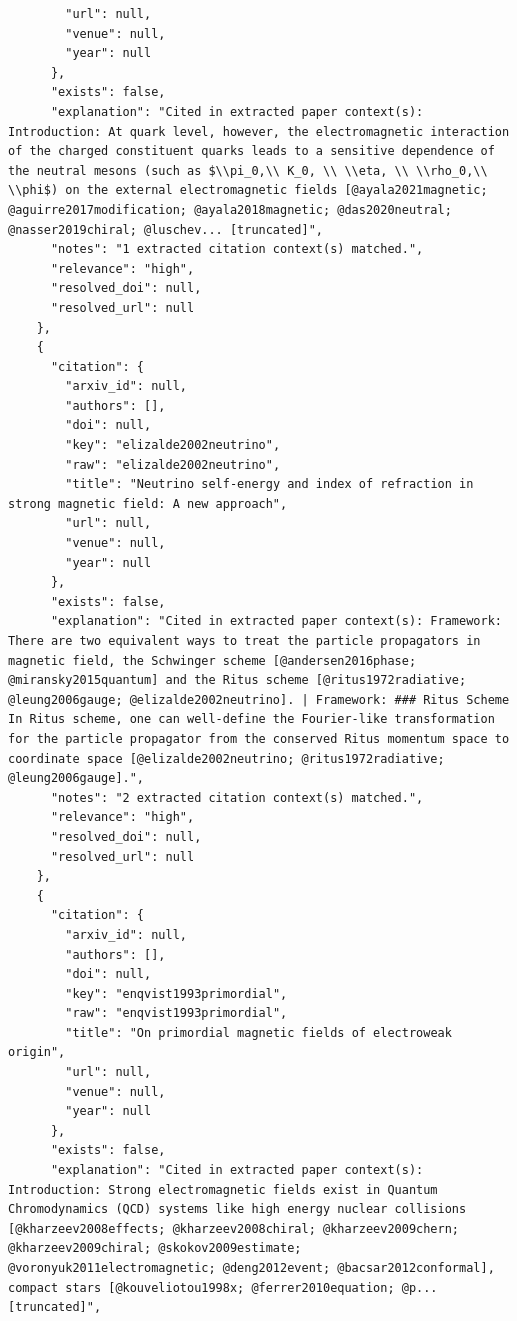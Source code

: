 \documentclass[11pt]{article}
\begin{document}
\begin{verbatim}
        "url": null,
        "venue": null,
        "year": null
      },
      "exists": false,
      "explanation": "Cited in extracted paper context(s): Introduction: At quark level, however, the electromagnetic interaction of the charged constituent quarks leads to a sensitive dependence of the neutral mesons (such as $\\pi_0,\\ K_0, \\ \\eta, \\ \\rho_0,\\ \\phi$) on the external electromagnetic fields [@ayala2021magnetic; @aguirre2017modification; @ayala2018magnetic; @das2020neutral; @nasser2019chiral; @luschev... [truncated]",
      "notes": "1 extracted citation context(s) matched.",
      "relevance": "high",
      "resolved_doi": null,
      "resolved_url": null
    },
    {
      "citation": {
        "arxiv_id": null,
        "authors": [],
        "doi": null,
        "key": "elizalde2002neutrino",
        "raw": "elizalde2002neutrino",
        "title": "Neutrino self-energy and index of refraction in strong magnetic field: A new approach",
        "url": null,
        "venue": null,
        "year": null
      },
      "exists": false,
      "explanation": "Cited in extracted paper context(s): Framework: There are two equivalent ways to treat the particle propagators in magnetic field, the Schwinger scheme [@andersen2016phase; @miransky2015quantum] and the Ritus scheme [@ritus1972radiative; @leung2006gauge; @elizalde2002neutrino]. | Framework: ### Ritus Scheme In Ritus scheme, one can well-define the Fourier-like transformation for the particle propagator from the conserved Ritus momentum space to coordinate space [@elizalde2002neutrino; @ritus1972radiative; @leung2006gauge].",
      "notes": "2 extracted citation context(s) matched.",
      "relevance": "high",
      "resolved_doi": null,
      "resolved_url": null
    },
    {
      "citation": {
        "arxiv_id": null,
        "authors": [],
        "doi": null,
        "key": "enqvist1993primordial",
        "raw": "enqvist1993primordial",
        "title": "On primordial magnetic fields of electroweak origin",
        "url": null,
        "venue": null,
        "year": null
      },
      "exists": false,
      "explanation": "Cited in extracted paper context(s): Introduction: Strong electromagnetic fields exist in Quantum Chromodynamics (QCD) systems like high energy nuclear collisions [@kharzeev2008effects; @kharzeev2008chiral; @kharzeev2009chern; @kharzeev2009chiral; @skokov2009estimate; @voronyuk2011electromagnetic; @deng2012event; @bacsar2012conformal], compact stars [@kouveliotou1998x; @ferrer2010equation; @p... [truncated]",

\end{verbatim}
\end{document}
